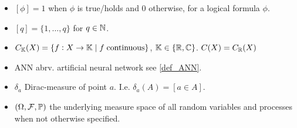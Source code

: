 



\begin{itemize}
  \item $[\phi] = 1$ when $\phi$ is true/holds and $0$ otherwise,
    for a logical formula $\phi$.
  \item $[q] = \{1,\dots,q\}$ for $q\in \mathbb{N}$.
  \item $C_{\mathbb{K}}(X) = \{ f : X \to \mathbb{K} \mid f \; \text{continuous} \}$,
    $\mathbb{K} \in \{ \mathbb{R}, \mathbb{C} \}$. $C(X) = C_\mathbb{R}(X)$
  \item ANN abrv. artificial neural network see \cref{def_ANN}.
  \item $\delta_a$ Dirac-measure of point $a$. I.e. $\delta_a(A) = [a \in A]$.
  \item $(\Omega, \mathcal{F}, \mathbb{P})$ the underlying measure space
    of all random variables and processes when not otherwise specified.
\end{itemize}

